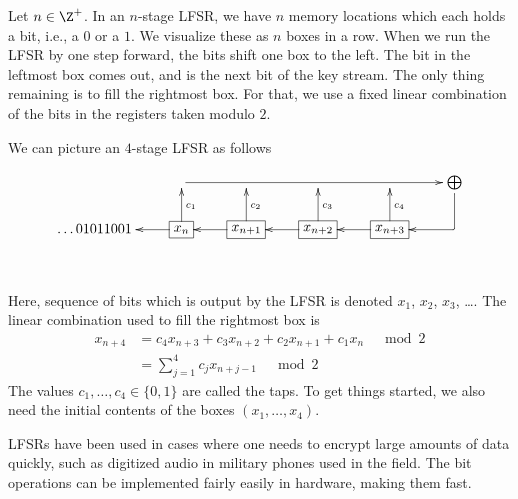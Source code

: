 \documentclass[12pt]{amsart}
\theoremstyle{plain}
\theoremstyle{definition}
\theoremstyle{remark}
\begin{document}
Let $n\in\Z^+$.  In an $n$-stage LFSR, we have $n$ memory locations
which each holds a bit, i.e., a $0$ or a $1$.  We visualize these as
$n$ boxes in a row.  When we run the LFSR by one step forward, the
bits shift one box to the left.  The bit in the leftmost box comes
out, and is the next bit of the key stream.  The only thing remaining
is to fill the rightmost box.  For that, we use a fixed linear
combination of the bits in the registers taken modulo $2$.

\begin{comment}
Let $n$ be a positive integer.  An $n$-stage LFSR generates its key
stream by a linear recurrence relation
\[ x_{k+n} = c_{n-1} x_{k+n-1}\pots c_0 x_k\]
where $(c_0\cots c_{n-1})\in\Z_2^n$ is a fixed vector called the
taps.  Note that if $c_0=0$, then the recurrence relation has
effectively at most $n-1$ terms, so would be an $n-1$-stage LFSR.  So,
we assume $c_0=1$.
\end{comment}

We can picture an $4$-stage LFSR as follows

\[
  \xymatrix@R-5pt{
& \ar[rrrr] & &  &  &  {\bigoplus} \ar `d/1pt[d] [ld] \\
\ldots01011001
&   *+[F]{x_n} \ar[l] \ar[u]_{c_1} & *+[F]{x_{n+1}} \ar[l]
  \ar[u]_{c_2} &*+[F]{x_{n+2}} \ar[l] \ar[u]_{c_3} &*+[F]{x_{n+3}} \ar[l]
  \ar[u]_{c_4}&   \\
&
}
\]

Here, sequence of bits which is output by the LFSR is denoted $x_1$,
$x_2$, $x_3$, \ldots.  The linear combination used to fill the
rightmost box is
\begin{align}
x_{n+4} &= c_4x_{n+3}+c_3 x_{n+2}+c_2 x_{n+1}+ c_1x_n \quad \bmod 2 \label{lfsrrecur}\\
&= \sum_{j=1}^4 c_j x_{n+j-1}\quad \bmod 2
\end{align}
The values $c_1, \ldots, c_4\in\{0,1\}$ are called the taps.  To get
things started, we also need the initial contents of the boxes $(x_1,\ldots, x_4)$.

LFSRs have been used in cases where one needs to encrypt large amounts
of data quickly, such as digitized audio in military phones used in
the field.  The bit operations can be implemented fairly easily in
hardware, making them fast.
\end{document}
